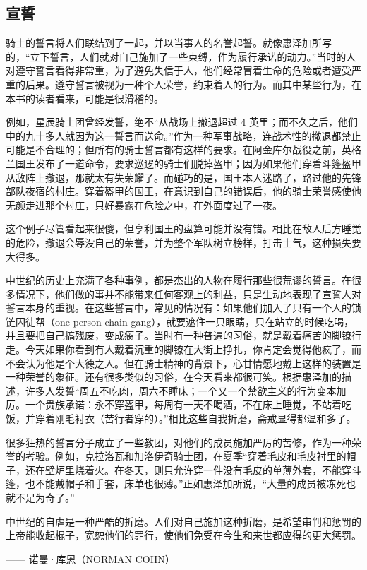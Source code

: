 \subsection{宣誓}
骑士的誓言将人们联结到了一起，并以当事人的名誉起誓。就像惠泽加所写的，“立下誓言，人们就对自己施加了一些束缚，作为履行承诺的动力。”当时的人对遵守誓言看得非常重，为了避免失信于人，他们经常冒着生命的危险或者遭受严重的后果。遵守誓言被视为一种个人荣誉，约束着人的行为。而其中某些行为，在本书的读者看来，可能是很滑稽的。

例如，星辰骑士团曾经发誓，绝不“从战场上撤退超过 4 英里；而不久之后，他们中的九十多人就因为这一誓言而送命。”作为一种军事战略，连战术性的撤退都禁止可能是不合理的；但所有的骑士誓言都有这样的要求。在阿金库尔战役之前，英格兰国王发布了一道命令，要求巡逻的骑士们脱掉盔甲；因为如果他们穿着斗篷盔甲从敌阵上撤退，那就太有失荣耀了。而碰巧的是，国王本人迷路了，路过他的先锋部队夜宿的村庄。穿着盔甲的国王，在意识到自己的错误后，他的骑士荣誉感使他无颜走进那个村庄，只好暴露在危险之中，在外面度过了一夜。

这个例子尽管看起来很傻，但亨利国王的盘算可能并没有错。相比在敌人后方睡觉的危险，撤退会辱没自己的荣誉，并为整个军队树立榜样，打击士气，这种损失要大得多。

中世纪的历史上充满了各种事例，都是杰出的人物在履行那些很荒谬的誓言。在很多情况下，他们做的事并不能带来任何客观上的利益，只是生动地表现了宣誓人对誓言本身的重视。在这些誓言中，常见的情况有：如果他们加入了只有一个人的锁链囚徒帮（one-person chain gang），就要遮住一只眼睛，只在站立的时候吃喝，并且要把自己搞残废，变成瘸子。当时有一种普遍的习俗，就是戴着痛苦的脚镣行走。今天如果你看到有人戴着沉重的脚镣在大街上挣扎，你肯定会觉得他疯了，而不会认为他是个大德之人。但在骑士精神的背景下，心甘情愿地戴上这样的装置是一种荣誉的象征。还有很多类似的习俗，在今天看来都很可笑。根据惠泽加的描述，许多人发誓“周五不吃肉，周六不睡床；一个又一个禁欲主义的行为变本加厉。一个贵族承诺：永不穿盔甲，每周有一天不喝酒，不在床上睡觉，不站着吃饭，并穿着刚毛衬衣（苦行者穿的）。”相比这些自我折磨，斋戒显得都温和多了。

很多狂热的誓言分子成立了一些教团，对他们的成员施加严厉的苦修，作为一种荣誉的考验。例如，克拉洛瓦和加洛伊奇骑士团，在夏季“穿着毛皮和毛皮衬里的帽子，还在壁炉里烧着火。在冬天，则只允许穿一件没有毛皮的单薄外套，不能穿斗篷，也不能戴帽子和手套，床单也很薄。”正如惠泽加所说，“大量的成员被冻死也就不足为奇了。”

\begin{tcolorbox}
中世纪的自虐是一种严酷的折磨。人们对自己施加这种折磨，是希望审判和惩罚的上帝能收起棍子，宽恕他们的罪行，使他们免受在今生和来世都应得的更大惩罚。
\begin{flushright}
—— 诺曼·库恩（NORMAN COHN）
\end{flushright}
\end{tcolorbox}


